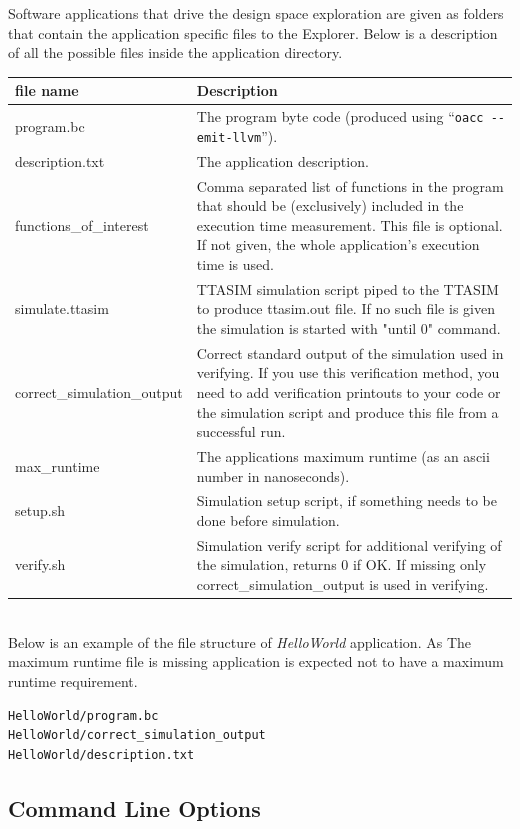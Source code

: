 \documentclass[a4paper,twoside]{tceusermanual}
\begin{document}
Software applications that drive the design space exploration are given as folders
that contain the application specific files to the Explorer. Below is a description
of all the possible files inside the application directory.

\begin{tabular}{p{}p{}}
\textbf{file name} &\textbf{Description} \\
\hline
program.bc & The program byte code (produced using ``\verb|oacc --emit-llvm|'').\\
description.txt & The application description.\\
functions\_of\_interest & Comma separated list of functions in the program
that should be (exclusively) included in the execution time measurement. This
file is optional. If not given, the whole application's execution time is used. \\
simulate.ttasim & TTASIM simulation script piped to the TTASIM to produce
ttasim.out file. If no such file is given the simulation is started with
"until 0" command.\\
correct\_simulation\_output & Correct standard output of the simulation used in
verifying. If you use this verification method, you need to add verification 
printouts to your code or the simulation script and produce this file from a
successful run.\\
max\_runtime & The applications maximum runtime (as an ascii number in nanoseconds).\\
setup.sh & Simulation setup script, if something needs to be done before
simulation.\\
verify.sh & Simulation verify script for additional verifying of the
simulation, returns 0 if OK. If missing only correct\_simulation\_output is used
in verifying.\\
\end{tabular}\\

Below is an example of the file structure of \emph{HelloWorld} application.
As The maximum runtime file is missing application is expected not to have a
maximum runtime requirement.
\begin{verbatim}
HelloWorld/program.bc
HelloWorld/correct_simulation_output
HelloWorld/description.txt
\end{verbatim}

\subsection{Command Line Options}
\end{document}
